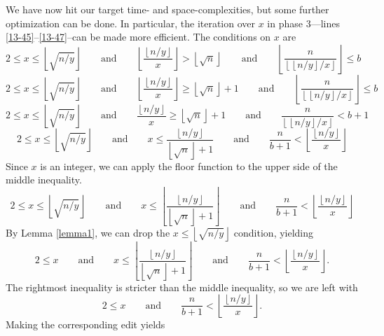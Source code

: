 \documentclass[12pt]{article}
\newcommand{\eqn}[1]{\begin{displaymath} #1 \end{displaymath}}
\newcommand{\floor}[1]{{\left\lfloor #1 \right\rfloor}}
\newcommand{\qquadtext}[1]{\qquad \text{#1} \qquad}
\newcommand{\floordiv}[2]{\floor{\frac{#1}{#2}}}
\newcommand{\isqrt}[1]{\floor{\sqrt{#1}}}
\begin{document}
We have now hit our target time- and space-complexities, but some further optimization can be done.  In particular, the iteration over $x$ in phase 3---lines \ref{13-45}--\ref{13-47}--can be made more efficient.  The conditions on $x$ are
\eqn{2 \leq x \leq \isqrt{n/y} \qquadtext{and} \floordiv{\floor{n/y}}{x} > \isqrt{n} \qquadtext{and} \floordiv{n}{\floor{\floor{n/y}/x}} \leq b}
\eqn{2 \leq x \leq \isqrt{n/y} \qquadtext{and} \floordiv{\floor{n/y}}{x} \geq \isqrt{n}+1 \qquadtext{and} \floordiv{n}{\floor{\floor{n/y}/x}} \leq b}
\eqn{2 \leq x \leq \isqrt{n/y} \qquadtext{and} \frac{\floor{n/y}}{x} \geq \isqrt{n}+1 \qquadtext{and} \frac{n}{\floor{\floor{n/y}/x}} < b+1}
\eqn{2 \leq x \leq \isqrt{n/y} \qquadtext{and} x \leq \frac{\floor{n/y}}{\isqrt{n}+1} \qquadtext{and} \frac{n}{b+1} < \floordiv{\floor{n/y}}{x}}
Since $x$ is an integer, we can apply the floor function to the upper side of the middle inequality.
\eqn{2 \leq x \leq \isqrt{n/y} \qquadtext{and} x \leq \floor{\frac{\floor{n/y}}{\isqrt{n}+1}} \qquadtext{and} \frac{n}{b+1} < \floordiv{\floor{n/y}}{x}}
By Lemma \ref{lemma1}, we can drop the $x \leq \isqrt{n/y}$ condition, yielding
\eqn{2 \leq x \qquadtext{and} x \leq \floor{\frac{\floor{n/y}}{\isqrt{n}+1}} \qquadtext{and} \frac{n}{b+1} < \floordiv{\floor{n/y}}{x}.}
The rightmost inequality is stricter than the middle inequality, so we are left with
\eqn{2 \leq x \qquadtext{and} \frac{n}{b+1} < \floordiv{\floor{n/y}}{x}.}
Making the corresponding edit yields
\end{document}
